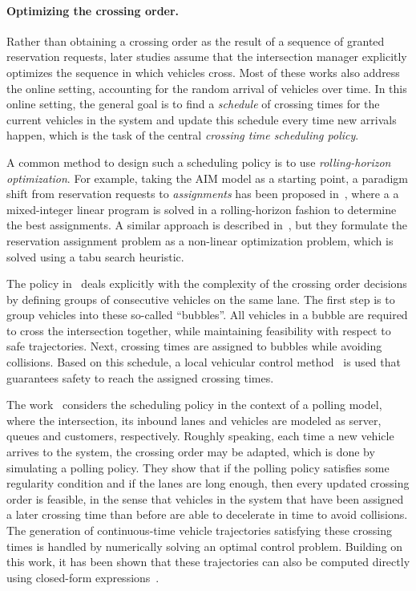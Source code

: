 \documentclass[a4paper]{report}
\theoremstyle{definition}
\theoremstyle{plain}
\begin{document}
\paragraph{Optimizing the crossing order.}

Rather than obtaining a crossing order as the result of a sequence of granted
reservation requests, later studies assume that the intersection manager
explicitly optimizes the sequence in which vehicles cross. Most of these works
also address the online setting, accounting for the random arrival of vehicles
over time.
%
In this online setting, the general goal is to find a \emph{schedule} of
crossing times for the current vehicles in the system and update this schedule
every time new arrivals happen, which is the task of the central \emph{crossing
  time scheduling policy}.

A common method to design such a scheduling policy is to use
\emph{rolling-horizon optimization}. For example, taking the AIM model as a
starting point, a paradigm shift from reservation requests to \emph{assignments}
has been proposed in~\cite{levinConflictpointFormulationIntersection2017}, where
a a mixed-integer linear program is solved in a rolling-horizon fashion to
determine the best assignments.
%
A similar approach is described
in~\cite{liTemporalspatialDimensionExtensionbased2019}, but they formulate the
reservation assignment problem as a non-linear optimization problem, which is
solved using a tabu search heuristic.

The policy in~\cite{tallapragadaHierarchicaldistributedOptimizedCoordination2017} deals explicitly with the complexity of the crossing order
decisions by defining groups of consecutive vehicles on the same lane. The first
step is to group vehicles into these so-called ``bubbles''. All vehicles in a
bubble are required to cross the intersection together, while maintaining
feasibility with respect to safe trajectories. Next, crossing times are assigned
to bubbles while avoiding collisions. Based on this schedule, a local vehicular
control method~\cite{tallapragadaDistributedControlVehicle2017} is used that guarantees safety to reach the assigned
crossing times.

The work~\cite{miculescuPollingsystemsbasedAutonomousVehicle2016} considers the scheduling policy in the context of a polling
model, where the intersection, its inbound lanes and vehicles are modeled as
server, queues and customers, respectively.
%
Roughly speaking, each time a new vehicle arrives to the system, the crossing
order may be adapted, which is done by simulating a polling policy.
%
They show that if the polling policy satisfies some regularity condition and if
the lanes are long enough, then every updated crossing order is feasible, in the
sense that vehicles in the system that have been assigned a later crossing time
than before are able to decelerate in time to avoid collisions.
%
The generation of continuous-time vehicle trajectories satisfying these crossing
times is handled by numerically solving an optimal control problem.
Building on this work, it has been shown that these trajectories can also be
computed directly using closed-form
expressions~\cite{timmermanPlatoonFormingAlgorithms2021}.
\end{document}
